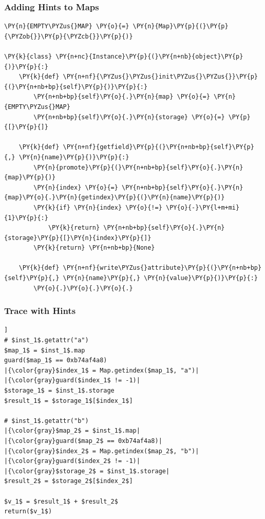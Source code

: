 \documentclass[utf8x]{beamer}
\begin{document}
\begin{frame}[containsverbatim]
\frametitle{Adding Hints to Maps}

\begin{Verbatim}[commandchars=\\\{\}]
\PY{n}{EMPTY\PYZus{}MAP} \PY{o}{=} \PY{n}{Map}\PY{p}{(}\PY{p}{\PYZob{}}\PY{p}{\PYZcb{}}\PY{p}{)}

\PY{k}{class} \PY{n+nc}{Instance}\PY{p}{(}\PY{n+nb}{object}\PY{p}{)}\PY{p}{:}
    \PY{k}{def} \PY{n+nf}{\PYZus{}\PYZus{}init\PYZus{}\PYZus{}}\PY{p}{(}\PY{n+nb+bp}{self}\PY{p}{)}\PY{p}{:}
        \PY{n+nb+bp}{self}\PY{o}{.}\PY{n}{map} \PY{o}{=} \PY{n}{EMPTY\PYZus{}MAP}
        \PY{n+nb+bp}{self}\PY{o}{.}\PY{n}{storage} \PY{o}{=} \PY{p}{[}\PY{p}{]}

    \PY{k}{def} \PY{n+nf}{getfield}\PY{p}{(}\PY{n+nb+bp}{self}\PY{p}{,} \PY{n}{name}\PY{p}{)}\PY{p}{:}
        \PY{n}{promote}\PY{p}{(}\PY{n+nb+bp}{self}\PY{o}{.}\PY{n}{map}\PY{p}{)}
        \PY{n}{index} \PY{o}{=} \PY{n+nb+bp}{self}\PY{o}{.}\PY{n}{map}\PY{o}{.}\PY{n}{getindex}\PY{p}{(}\PY{n}{name}\PY{p}{)}
        \PY{k}{if} \PY{n}{index} \PY{o}{!=} \PY{o}{-}\PY{l+m+mi}{1}\PY{p}{:}
            \PY{k}{return} \PY{n+nb+bp}{self}\PY{o}{.}\PY{n}{storage}\PY{p}{[}\PY{n}{index}\PY{p}{]}
        \PY{k}{return} \PY{n+nb+bp}{None}

    \PY{k}{def} \PY{n+nf}{write\PYZus{}attribute}\PY{p}{(}\PY{n+nb+bp}{self}\PY{p}{,} \PY{n}{name}\PY{p}{,} \PY{n}{value}\PY{p}{)}\PY{p}{:}
        \PY{o}{.}\PY{o}{.}\PY{o}{.}
\end{Verbatim}
\end{frame}


\begin{frame}
  \frametitle{Trace with Hints}
\begin{lstlisting}[mathescape,escapechar=|,basicstyle=\ttfamily]]
# $inst_1$.getattr("a")
$map_1$ = $inst_1$.map
guard($map_1$ == 0xb74af4a8)
|{\color{gray}$index_1$ = Map.getindex($map_1$, "a")|
|{\color{gray}guard($index_1$ != -1)|
$storage_1$ = $inst_1$.storage
$result_1$ = $storage_1$[$index_1$]

# $inst_1$.getattr("b")
|{\color{gray}$map_2$ = $inst_1$.map|
|{\color{gray}guard($map_2$ == 0xb74af4a8)|
|{\color{gray}$index_2$ = Map.getindex($map_2$, "b")|
|{\color{gray}guard($index_2$ != -1)|
|{\color{gray}$storage_2$ = $inst_1$.storage|
$result_2$ = $storage_2$[$index_2$]

$v_1$ = $result_1$ + $result_2$
return($v_1$)
\end{lstlisting}
\end{frame}
\end{document}
